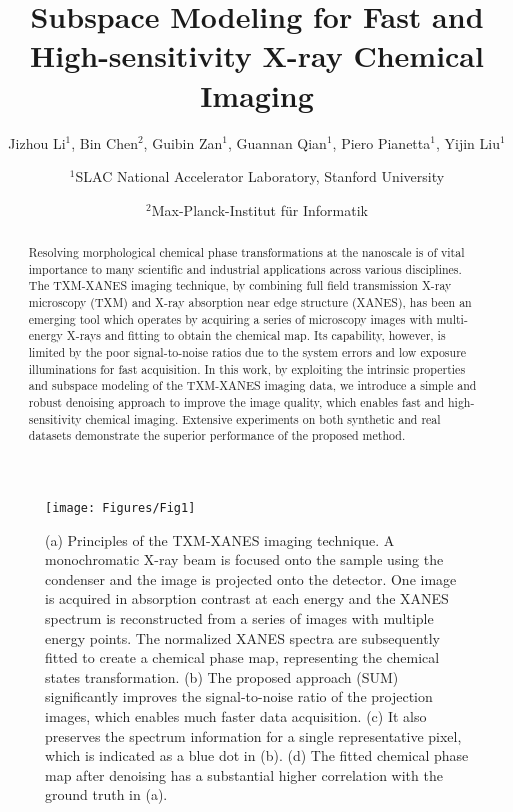 \documentclass[10pt,twocolumn,letterpaper]{article}
\begin{document}
\title{Subspace Modeling for Fast and High-sensitivity X-ray Chemical Imaging}

\author{Jizhou Li$^1$, Bin Chen$^2$, Guibin Zan$^1$, Guannan Qian$^1$, Piero Pianetta$^1$, Yijin Liu$^1$\and
$^1$SLAC National Accelerator Laboratory, Stanford University
\and $^2$Max-Planck-Institut für Informatik
}
\maketitle
\begin{figure*}
  \centering
    \texttt{[image: Figures/Fig1]}
    \vspace{-6pt}
    \caption{(a) Principles of the TXM-XANES imaging technique. A monochromatic X-ray beam is focused onto the sample using the condenser and the image is projected onto the detector. One image is acquired in absorption contrast at each energy and the XANES spectrum is reconstructed from a series of images with multiple energy points. The normalized XANES spectra are subsequently fitted to create a chemical phase map, representing the chemical states transformation. (b) The proposed approach (SUM) significantly improves the signal-to-noise ratio of the projection images, which enables much faster data acquisition. (c) It also preserves the spectrum information for a single representative pixel, which is indicated as a blue dot in (b). (d) The fitted chemical phase map after denoising has a substantial higher correlation with the ground truth in (a).}
    \vspace{-6pt}
    \label{fig1}
\end{figure*}
\begin{abstract}
  Resolving morphological chemical phase transformations at the nanoscale is of vital importance to many scientific and industrial applications across various disciplines. The TXM-XANES imaging technique, by combining full field transmission X-ray microscopy (TXM) and X-ray absorption near edge structure (XANES), has been an emerging tool which operates by acquiring a series of microscopy images with multi-energy X-rays and fitting to obtain the chemical map. Its capability, however, is limited by the poor signal-to-noise ratios due to the system errors and low exposure illuminations for fast acquisition. In this work, by exploiting the intrinsic properties and subspace modeling of the TXM-XANES imaging data, we introduce a simple and robust denoising approach to improve the image quality, which enables fast and high-sensitivity chemical imaging. Extensive experiments on both synthetic and real datasets demonstrate the superior performance of the proposed method.
\end{abstract}
\end{document}

